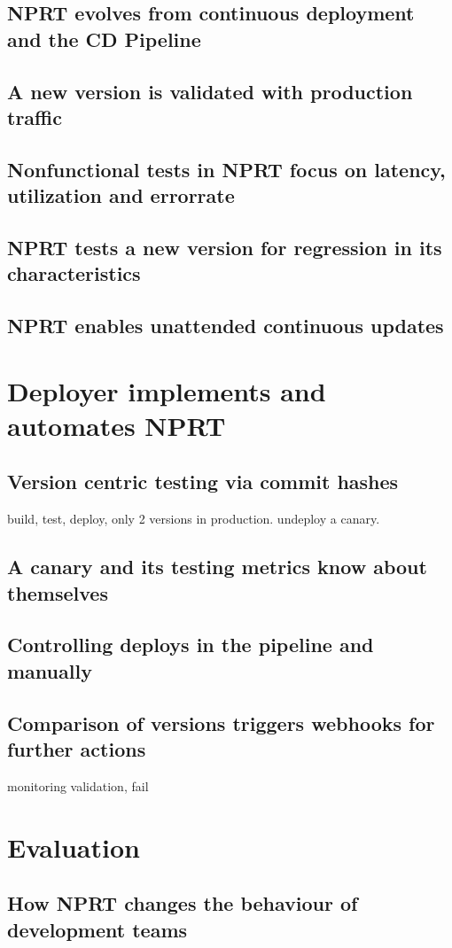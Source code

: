 \section{NPRT evolves from continuous deployment and the CD Pipeline}
\section{A new version is validated with production traffic}
\section{Nonfunctional tests in NPRT focus on latency, utilization and errorrate}
\section{NPRT tests a new version for regression in its characteristics}
\section{NPRT enables unattended continuous updates}

\chapter{Deployer implements and automates NPRT}
\section{Version centric testing via commit hashes}
build, test, deploy, only 2 versions in production. undeploy a canary.
\section{A canary and its testing metrics know about themselves}
\section{Controlling deploys in the pipeline and manually}
\section{Comparison of versions triggers webhooks for further actions}
monitoring validation, fail

\chapter{Evaluation}
\section{How NPRT changes the behaviour of development teams}
